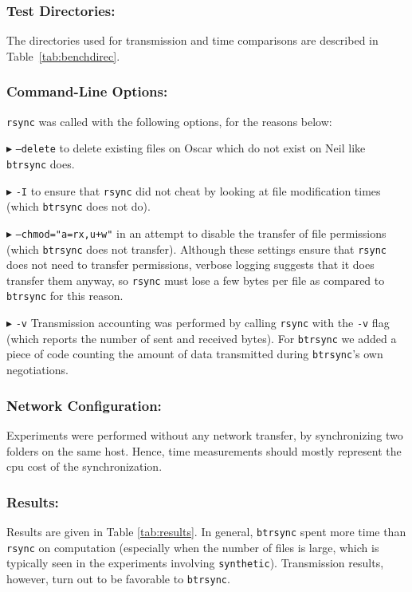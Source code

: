 \documentclass[11pt]{llncs}
\newcommand{\btrsync}{\texttt{btrsync}\xspace}
\newcommand{\rsync}{\texttt{rsync}\xspace}
\begin{document}
\subsubsection{Test Directories:} The directories used for transmission and time
comparisons are described in Table~\ref{tab:benchdirec}.\smallskip

\subsubsection{Command-Line Options:} \rsync was called with the following options, for the reasons below:

$\blacktriangleright$ {\tt --delete} to delete existing files on Oscar which do
not exist on Neil like \btrsync does.\smallskip

$\blacktriangleright$ {\tt -I} to ensure that \rsync did not cheat by looking at file modification times (which \btrsync does not do).\smallskip

$\blacktriangleright$ {\tt --chmod="a=rx,u+w"} in an attempt to disable the transfer of file permissions (which \btrsync does not transfer). Although these settings ensure that \rsync does not need to transfer permissions, verbose logging suggests that it does transfer them anyway, so \rsync must lose a few bytes per file as compared to \btrsync for this reason.\smallskip

$\blacktriangleright$ {\tt -v} Transmission accounting was performed by calling \rsync with the {\tt -v} flag (which reports the number of sent and received bytes). For \btrsync we added a piece of code counting the amount of data transmitted during \btrsync's own negotiations.\smallskip

\subsubsection{Network Configuration:} Experiments were performed without any network transfer, by synchronizing two folders on the same host. Hence, time measurements should mostly represent the {\sc cpu} cost of the synchronization.

\subsubsection{Results:}

Results are given in Table \ref{tab:results}. In general, \btrsync spent more time than \rsync on computation (especially when the number of files is large, which is typically seen in the experiments involving {\tt synthetic}). Transmission results, however, turn out to be favorable to \btrsync.\smallskip
\end{document}

